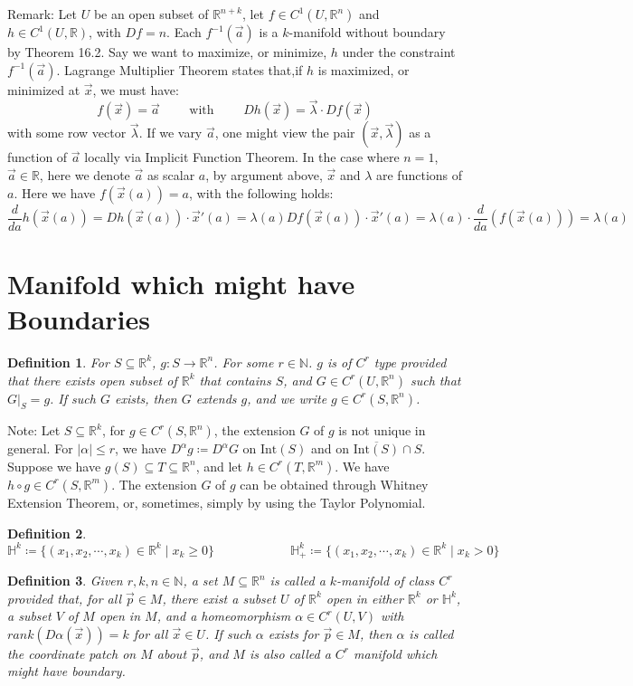\documentclass[11pt,oneside]{book}
\theoremstyle{break}
\theoremstyle{break}
\newtheorem{defn}{Definition}[corL]
\newcommand{\R}{\mathbb{R}}
\newcommand{\N}{\mathbb{N}}
\newcommand{\Int}{\text{Int}}
\newcommand{\note}{\color{red}Note: \color{black}}
\newcommand{\remark}{\color{blue}Remark: \color{black}}
\begin{document}
\remark Let $U$ be an open subset of $\R^{n+k}$, let $f\in C^1(U,\R^n)$ and $h \in C^1(U,\R)$, with $Df = n$. Each $f^{-1}(\vec{a})$ is a $k$-manifold without boundary by Theorem 16.2. Say we want to maximize, or minimize, $h$ under the constraint $f^{-1}(\vec{a})$. Lagrange Multiplier Theorem states that,if $h$ is maximized, or minimized at $\vec{x}$, we must have: $$f(\vec{x}) = \vec{a} \qquad\text{ with }\qquad Dh(\vec{x}) =\vec{\lambda}\cdot Df(\vec{x})$$ 
with some row vector $\vec{\lambda}$. If we vary $\vec{a}$, one might view the pair $(\vec{x},\vec{\lambda})$ as a function of $\vec{a}$ locally via Implicit Function Theorem. In the case where $n=1$, $\vec{a}\in \R$, here we denote $\vec{a}$ as scalar $a$, by argument above, $\vec{x}$ and $\lambda$ are functions of $a$. Here we have $f(\vec{x}(a)) = a$, with the following holds:
$$\frac{d}{da}h(\vec{x}(a)) = Dh(\vec{x}(a) ) \cdot \vec{x}'(a) = \lambda(a) Df(\vec{x}(a))\cdot \vec{x}'(a) = \lambda(a) \cdot \frac{d}{da}(f(\vec{x}(a))) = \lambda(a)$$

\newpage
\section[Manifolds which might have Boundaries]{\color{red}Manifold which might have Boundaries\color{black}}
\begin{defn}
For $S \subseteq \R^k$, $g:S \to \R^n$. For some $r \in \N$. $g$ is of $C^r$ type provided that there exists open subset of $\R^k$ that contains $S$, and $G \in C^r(U,\R^n)$ such that $G|_S = g$. If such $G$ exists, then $G$ extends $g$, and we write $g\in C^r(S,\R^n)$.
\end{defn}
\note Let $S\subseteq \R^k$, for $g\in C^r(S,\R^n)$, the extension $G$ of $g$ is not unique in general. For $|\alpha| \leq r$, we have $D^\alpha g \coloneqq D^\alpha G$ on $\Int(S)$ and on $\overline{\Int(S)}\cap S$. Suppose we have $g(S) \subseteq T \subseteq \R^n$, and let $h\in C^r(T,\R^m)$. We have $h\circ g \in C^r(S,\R^m)$. The extension $G$ of $g$ can be obtained through Whitney Extension Theorem, or, sometimes, simply by using the Taylor Polynomial. \\


\begin{defn}
$$\mathbb{H}^k\coloneqq \{(x_1,x_2,\cdots,x_k)\in \R^k \mid x_k \geq 0\} \qquad\qquad\qquad \mathbb{H}_+^k \coloneqq \{(x_1,x_2,\cdots,x_k)\in \R^k \mid x_k > 0\}$$
\end{defn}
\hfill\break
\begin{defn}
Given $r,k,n \in \N$, a set $M \subseteq \R^n$ is called a $k$-manifold of class $C^r$ provided that, for all $\vec{p}\in M$, there exist a subset $U$ of $\R^k$ open in either $\R^k$ or $\mathbb{H}^k$, a subset $V$ of $M$ open in $M$, and a homeomorphism $\alpha \in C^r(U,V)$ with $rank(D\alpha(\vec{x})) = k$ for all $\vec{x}\in U$. If such $\alpha$ exists for $\vec{p}\in M$, then $\alpha$ is called the coordinate patch on $M$ about $\vec{p}$, and $M$ is also called a $C^r$ manifold which might have  boundary. 
\end{defn}
\end{document}
